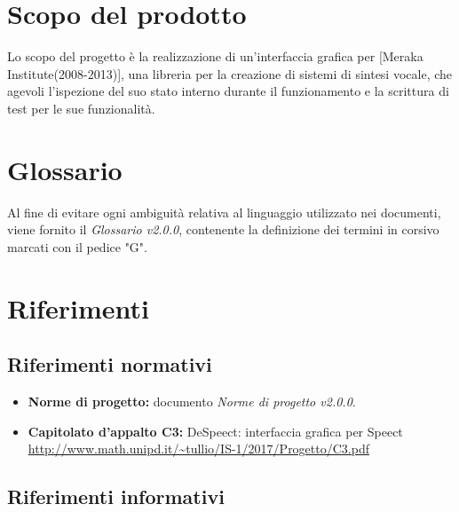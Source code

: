 \documentclass[openany,12pt,a4paper]{report}
\begin{document}
    \section{Scopo del prodotto}
    
    Lo scopo del progetto è la realizzazione di un’interfaccia grafica per  [Meraka Institute(2008-2013)], una libreria per la creazione di sistemi di sintesi vocale, che agevoli l’ispezione del suo stato interno durante il funzionamento e la scrittura di test per le sue funzionalità.
    
    \section{Glossario}
    
    Al fine di evitare ogni ambiguità relativa al linguaggio utilizzato nei documenti, viene fornito il \textit{Glossario v2.0.0}, contenente la definizione dei termini in corsivo marcati con il pedice "G".
    
    \section{Riferimenti}
    
    \subsection*{Riferimenti normativi}
    
    \begin{itemize}
    
        \item \textbf{Norme di progetto:} documento \textit{Norme di progetto v2.0.0}.
        
        \item\textbf{Capitolato d'appalto C3:} DeSpeect: interfaccia grafica per Speect \\ \url{http://www.math.unipd.it/~tullio/IS-1/2017/Progetto/C3.pdf}
    
    \end{itemize}
    
    \subsection*{Riferimenti informativi}
    
\end{document}
